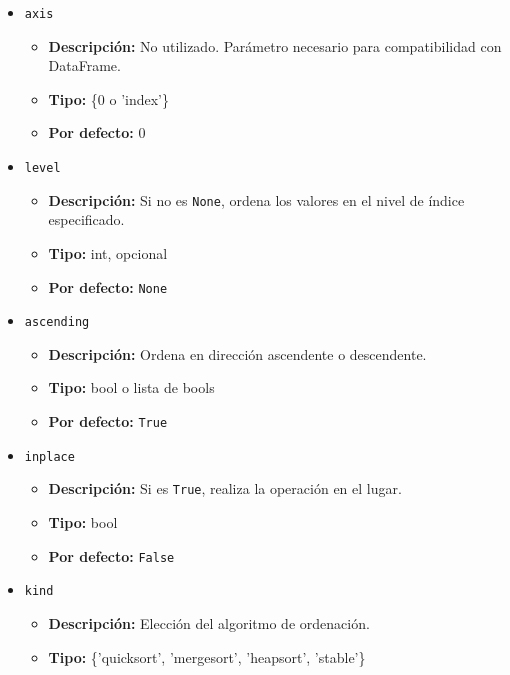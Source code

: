 \begin{itemize}
    \item \texttt{axis}
          \begin{itemize}
              \item \textbf{Descripción:} No utilizado. Parámetro necesario
                    para compatibilidad con DataFrame.
              \item \textbf{Tipo:} \{0 o 'index'\}
              \item \textbf{Por defecto:} 0
          \end{itemize}
    \item \texttt{level}
          \begin{itemize}
              \item \textbf{Descripción:} Si no es \texttt{None}, ordena los
                    valores en el nivel de índice especificado.
              \item \textbf{Tipo:} int, opcional
              \item \textbf{Por defecto:} \texttt{None}
          \end{itemize}
    \item \texttt{ascending}
          \begin{itemize}
              \item \textbf{Descripción:} Ordena en dirección ascendente o
                    descendente.
              \item \textbf{Tipo:} bool o lista de bools
              \item \textbf{Por defecto:} \texttt{True}
          \end{itemize}
    \item \texttt{inplace}
          \begin{itemize}
              \item \textbf{Descripción:} Si es \texttt{True}, realiza la
                    operación en el lugar.
              \item \textbf{Tipo:} bool
              \item \textbf{Por defecto:} \texttt{False}
          \end{itemize}
    \item \texttt{kind}
          \begin{itemize}
              \item \textbf{Descripción:} Elección del algoritmo de ordenación.
              \item \textbf{Tipo:} \{'quicksort', 'mergesort', 'heapsort',
                    'stable'\}

\end{itemize}
\end{itemize}
